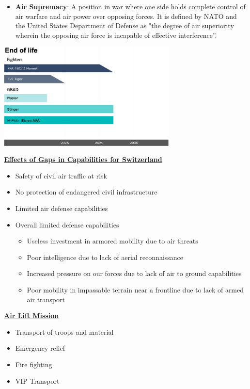\documentclass[9pt, landscape, fleqn]{scrartcl}
\begin{document}
\begin{multicols*}{3}
\begin{itemize}
    \item \textbf{Air Supremacy}: A position in war where one side holds complete control of air warfare and air power over opposing forces. It is defined by NATO and the United States Department of Defense as "the degree of air superiority wherein the opposing air force is incapable of effective interference”.
\end{itemize}
\begin{center}
    \includegraphics[width=9cm]{Images/End_of_Life.png}
\end{center}
\underline{\textbf{Effects of Gaps in Capabilities for Switzerland}}
\begin{itemize}
    \item Safety of civil air traffic at risk
    \item No protection of endangered civil infrastructure
    \item Limited air defense capabilities
    \item Overall limited defense capabilities
    \begin{itemize}
        \item Useless investment in armored mobility due to air threats
        \item Poor intelligence due to lack of aerial reconnaissance
        \item Increased pressure on our forces due to lack of air to ground capabilities
        \item Poor mobility in impassable terrain near a frontline due to lack of armed air transport
    \end{itemize}
\end{itemize}
\underline{\textbf{Air Lift Mission}}
\begin{itemize}
    \item Transport of troops and material
    \item Emergency relief
    \item Fire fighting
    \item VIP Transport

\end{itemize}
\end{multicols*}
\end{document}
